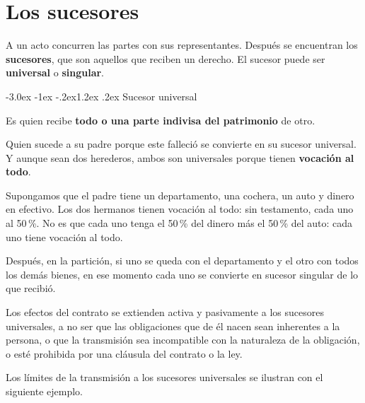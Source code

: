 \documentclass[12pt,oneside]{book}
\makeatletter
\renewcommand\section{\@startsection{section}{1}{\z@}%
  {-3.0ex \@plus -1ex \@minus -.2ex}{1.2ex \@plus .2ex}%
  {\normalfont\large\bfseries\color{acento}}}
\makeatother
\begin{document}

\chapter{Los sucesores}
A un acto concurren las partes con sus representantes. Después se encuentran los \textbf{sucesores}, que son aquellos que reciben un derecho. El sucesor puede ser \textbf{universal} o \textbf{singular}.

\section{Sucesor universal}

\begin{definicion}
Es quien recibe \textbf{todo o una parte indivisa del patrimonio} de otro.
\end{definicion}

Quien sucede a su padre porque este falleció se convierte en su sucesor universal. Y aunque sean dos herederos, ambos son universales porque tienen \textbf{vocación al todo}.

\begin{ejemplo}
Supongamos que el padre tiene un departamento, una cochera, un auto y dinero en efectivo. Los dos hermanos tienen vocación al todo: sin testamento, cada uno al 50\,\%. No es que cada uno tenga el 50\,\% del dinero más el 50\,\% del auto: cada uno tiene vocación al todo.

\smallskip
Después, en la partición, si uno se queda con el departamento y el otro con todos los demás bienes, en ese momento cada uno se convierte en sucesor singular de lo que recibió.
\end{ejemplo}

\begin{regla}
Los efectos del contrato se extienden activa y pasivamente a los sucesores universales, a no ser que las obligaciones que de él nacen sean inherentes a la persona, o que la transmisión sea incompatible con la naturaleza de la obligación, o esté prohibida por una cláusula del contrato o la ley.
\end{regla}

Los límites de la transmisión a los sucesores universales se ilustran con el siguiente ejemplo.
\end{document}
